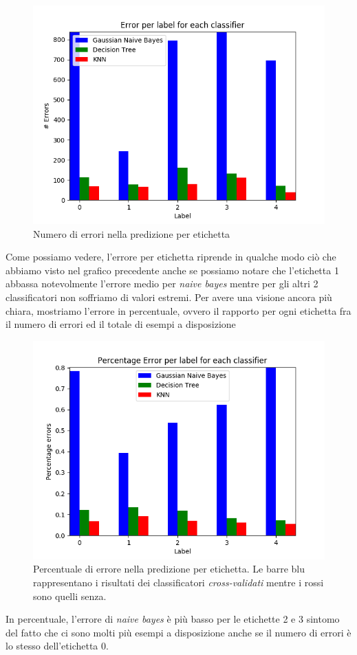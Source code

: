 \begin{figure}[H]
	\centering
	\includegraphics[width=0.7\linewidth]{img/test_error_per_label}
	\caption{Numero di errori nella predizione per etichetta}
	\label{fig:testerrorperlabel}
\end{figure}
Come possiamo vedere, l'errore per etichetta riprende in qualche modo ci\`o che abbiamo visto nel grafico precedente anche se possiamo notare che l'etichetta 1 abbassa notevolmente l'errore medio per \textit{naive bayes} mentre per gli altri 2 classificatori non soffriamo di valori estremi.
Per avere una visione ancora pi\`u chiara, mostriamo l'errore in percentuale, ovvero il rapporto per ogni etichetta fra il numero di errori ed il totale di esempi a disposizione 
\medskip
\begin{figure}[H]
	\centering
	\includegraphics[width=0.7\linewidth]{img/percentage_test_errors_per_label}
	\caption{Percentuale di errore nella predizione per etichetta. Le barre blu rappresentano i risultati dei classificatori \textit{cross-validati} mentre i rossi sono quelli senza.}
	\label{fig:percentagetesterrorsperlabel}
\end{figure}

In percentuale, l'errore di \textit{naive bayes} \`e pi\`u basso per le etichette 2 e 3 sintomo del fatto che ci sono molti pi\`u esempi a disposizione anche se il numero di errori \`e lo stesso dell'etichetta 0.

